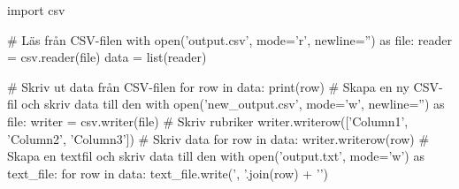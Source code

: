 import csv

# Läs från CSV-filen
with open('output.csv', mode='r', newline='') as file:
    reader = csv.reader(file)
    data = list(reader)

# Skriv ut data från CSV-filen
for row in data:
    print(row)
    # Skapa en ny CSV-fil och skriv data till den
    with open('new_output.csv', mode='w', newline='') as file:
        writer = csv.writer(file)
        # Skriv rubriker
        writer.writerow(['Column1', 'Column2', 'Column3'])
        # Skriv data
        for row in data:
            writer.writerow(row)
            # Skapa en textfil och skriv data till den
            with open('output.txt', mode='w') as text_file:
                for row in data:
                    text_file.write(', '.join(row) + '\n')

    